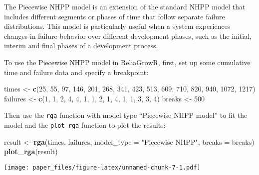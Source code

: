 \documentclass[
]{article}
\newenvironment{Shaded}{\begin{snugshade}}{\end{snugshade}}
\newcommand{\AttributeTok}[1]{\textcolor[rgb]{0.13,0.29,0.53}{#1}}
\newcommand{\DecValTok}[1]{\textcolor[rgb]{0.00,0.00,0.81}{#1}}
\newcommand{\FunctionTok}[1]{\textcolor[rgb]{0.13,0.29,0.53}{\textbf{#1}}}
\newcommand{\NormalTok}[1]{#1}
\newcommand{\OtherTok}[1]{\textcolor[rgb]{0.56,0.35,0.01}{#1}}
\newcommand{\StringTok}[1]{\textcolor[rgb]{0.31,0.60,0.02}{#1}}
\begin{document}
The Piecewise NHPP model is an extension of the standard NHPP model that
includes different segments or phases of time that follow separate
failure distributions. This model is particularly useful when a system
experiences changes in failure behavior over different development
phases, such as the initial, interim and final phases of a development
process.

To use the Piecewise NHPP model in ReliaGrowR, first, set up some
cumulative time and failure data and specify a breakpoint:

\begin{Shaded}
\begin{Highlighting}[]
\NormalTok{times }\OtherTok{\textless{}{-}} \FunctionTok{c}\NormalTok{(}\DecValTok{25}\NormalTok{, }\DecValTok{55}\NormalTok{, }\DecValTok{97}\NormalTok{, }\DecValTok{146}\NormalTok{, }\DecValTok{201}\NormalTok{, }\DecValTok{268}\NormalTok{, }\DecValTok{341}\NormalTok{, }\DecValTok{423}\NormalTok{, }\DecValTok{513}\NormalTok{, }\DecValTok{609}\NormalTok{, }\DecValTok{710}\NormalTok{, }\DecValTok{820}\NormalTok{, }\DecValTok{940}\NormalTok{, }\DecValTok{1072}\NormalTok{, }\DecValTok{1217}\NormalTok{)}
\NormalTok{failures }\OtherTok{\textless{}{-}} \FunctionTok{c}\NormalTok{(}\DecValTok{1}\NormalTok{, }\DecValTok{1}\NormalTok{, }\DecValTok{2}\NormalTok{, }\DecValTok{4}\NormalTok{, }\DecValTok{4}\NormalTok{, }\DecValTok{1}\NormalTok{, }\DecValTok{1}\NormalTok{, }\DecValTok{2}\NormalTok{, }\DecValTok{1}\NormalTok{, }\DecValTok{4}\NormalTok{, }\DecValTok{1}\NormalTok{, }\DecValTok{1}\NormalTok{, }\DecValTok{3}\NormalTok{, }\DecValTok{3}\NormalTok{, }\DecValTok{4}\NormalTok{)}
\NormalTok{breaks }\OtherTok{\textless{}{-}} \DecValTok{500}
\end{Highlighting}
\end{Shaded}

Then use the \texttt{rga} function with model type ``Piecewise NHPP
model'' to fit the model and the \texttt{plot\_rga} function to plot the
results:

\begin{Shaded}
\begin{Highlighting}[]
\NormalTok{result }\OtherTok{\textless{}{-}} \FunctionTok{rga}\NormalTok{(times, failures, }\AttributeTok{model\_type =} \StringTok{"Piecewise NHPP"}\NormalTok{, }\AttributeTok{breaks =}\NormalTok{ breaks)}
\FunctionTok{plot\_rga}\NormalTok{(result)}
\end{Highlighting}
\end{Shaded}

\texttt{[image: paper\_files/figure-latex/unnamed-chunk-7-1.pdf]}
\end{document}

